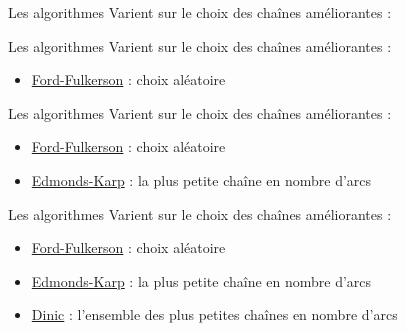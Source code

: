 \begin{frame}{Les algorithmes}
	Varient sur le choix des chaînes améliorantes : \vfill
\end{frame}

\begin{frame}{Les algorithmes}
	Varient sur le choix des chaînes améliorantes : \vfill
	\begin{itemize}
		\item \underline{Ford-Fulkerson} : choix aléatoire \vfill
	\end{itemize}
\end{frame}

\begin{frame}{Les algorithmes}
	Varient sur le choix des chaînes améliorantes : \vfill
	\begin{itemize}
		\item \underline{Ford-Fulkerson} : choix aléatoire \vfill
		\item \underline{Edmonds-Karp} : la plus petite chaîne en nombre d'arcs\vfill
	\end{itemize}
\end{frame}

\begin{frame}{Les algorithmes}
	Varient sur le choix des chaînes améliorantes : \vfill
	\begin{itemize}
		\item \underline{Ford-Fulkerson} : choix aléatoire \vfill
		\item \underline{Edmonds-Karp} : la plus petite chaîne en nombre d'arcs\vfill
		\item \underline{Dinic} : l'ensemble des plus petites chaînes en nombre d'arcs \vfill
	\end{itemize}
\end{frame}

